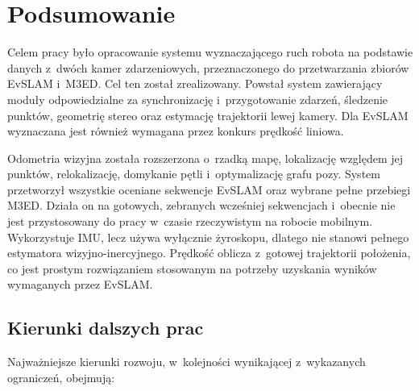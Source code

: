 \chapter{Podsumowanie}
\label{cha:podsumowanie}


Celem pracy było opracowanie systemu wyznaczającego ruch robota na podstawie danych z~dwóch kamer zdarzeniowych, przeznaczonego do przetwarzania zbiorów EvSLAM i~M3ED. Cel ten został zrealizowany. Powstał system zawierający moduły odpowiedzialne za synchronizację i~przygotowanie zdarzeń, śledzenie punktów, geometrię stereo oraz estymację trajektorii lewej kamery. Dla EvSLAM wyznaczana jest również wymagana przez konkurs prędkość liniowa.

Odometria wizyjna została rozszerzona o~rzadką mapę, lokalizację względem jej punktów, relokalizację, domykanie pętli i~optymalizację grafu pozy. System przetworzył wszystkie oceniane sekwencje EvSLAM oraz wybrane pełne przebiegi M3ED. Działa on na gotowych, zebranych wcześniej sekwencjach i~obecnie nie jest przystosowany do pracy w~czasie rzeczywistym na robocie mobilnym. Wykorzystuje IMU, lecz używa wyłącznie żyroskopu, dlatego nie stanowi pełnego estymatora wizyjno-inercyjnego. Prędkość oblicza z~gotowej trajektorii położenia, co jest prostym rozwiązaniem stosowanym na potrzeby uzyskania wyników wymaganych przez EvSLAM.

\section{Kierunki dalszych prac}
\label{sec:dalsze_prace}

Najważniejsze kierunki rozwoju, w~kolejności wynikającej z~wykazanych ograniczeń, obejmują:

